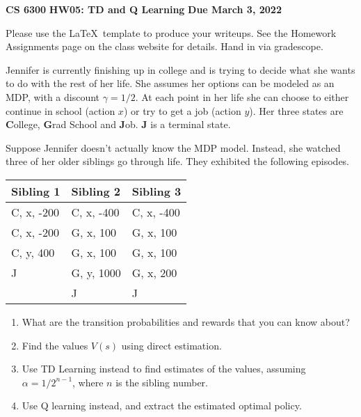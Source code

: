 \documentclass[12pt]{article}
\begin{document}
\begin{center}
{\bf CS 6300} \hfill {\large\bf HW05: TD and Q Learning} \hfill {\bf Due March 3, 2022}
\end{center}

\noindent
Please use the \LaTeX\ template to produce your writeups. See the
Homework Assignments page on the class website for details.  Hand in
via gradescope.

Jennifer is currently finishing up in college and is trying to decide
what she wants to do with the rest of her life.  She assumes her
options can be modeled as an MDP, with a discount $\gamma=1/2$.  At
each point in her life she can choose to either continue in school
(action $x$) or try to get a job (action $y$).  Her three states are
{\bf C}ollege, {\bf G}rad School and {\bf J}ob.  {\bf J} is a terminal
state.

Suppose Jennifer doesn't actually know the MDP model.  Instead, she
watched three of her older siblings go through life.  They exhibited
the following episodes.

\begin{center}
\begin{tabular}{|l|l|l|} \hline
{\bf Sibling 1} & {\bf Sibling 2} & {\bf Sibling 3} \\ \hline
    C, x, -200 & C, x, -400 & C, x, -400 \\
    C, x, -200 & G, x,  100 & G, x,  100 \\
    C, y,  400 & G, x,  100 & G, x,  100 \\
    J          & G, y, 1000 & G, x,  200 \\
               & J          & J          \\ \hline
\end{tabular}
\end{center}

  \begin{enumerate}

  \item What are the transition probabilities and rewards that you can
    know about?

  \item Find the values $V(s)$ using direct estimation.

  \item Use TD Learning instead to find estimates of the values,
    assuming $\alpha=1/2^{n-1}$, where $n$ is the sibling number.

  \item Use Q learning instead, and extract the estimated optimal policy.

  \end{enumerate}
\end{document}
